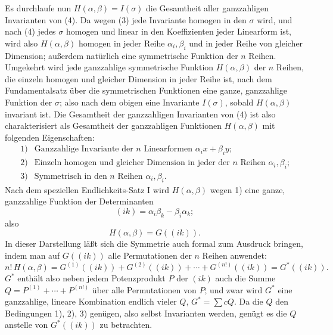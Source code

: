 \documentclass[11pt]{article}
\begin{document}
Es durchlaufe nun \(H(\alpha,\beta)=I(\sigma)\) die Gesamtheit aller ganzzahligen Invarianten von (4). Da wegen (3) jede Invariante homogen in den \(\sigma\) wird, und nach (4) jedes \(\sigma\) homogen und linear in den Koeffizienten jeder Linearform ist, wird also \(H(\alpha,\beta)\) homogen in jeder Reihe \(\alpha_i,\beta_i\) und in jeder Reihe von gleicher Dimension; außerdem natürlich eine symmetrische Funktion der \(n\) Reihen. Umgekehrt wird jede ganzzahlige symmetrische Funktion \(H(\alpha,\beta)\) der \(n\) Reihen, die einzeln homogen und gleicher Dimension in jeder Reihe ist, nach dem Fundamentalsatz über die symmetrischen Funktionen eine ganze, ganzzahlige Funktion der \(\sigma\); also nach dem obigen eine Invariante \(I(\sigma)\), sobald \(H(\alpha,\beta)\) invariant ist. Die Gesamtheit der ganzzahligen Invarianten von (4) ist also charakterisiert als Gesamtheit der ganzzahligen Funktionen \(H(\alpha,\beta)\) mit folgenden Eigenschaften:
\[
\begin{array}{ll}
1) & \text{Ganzzahlige Invariante der \(n\) Linearformen \(\alpha_i x+\beta_i y\);}\\
2) & \text{Einzeln homogen und gleicher Dimension in jeder der \(n\) Reihen \(\alpha_i,\beta_i\);}\\
3) & \text{Symmetrisch in den \(n\) Reihen \(\alpha_i,\beta_i\).}
\end{array}
\]
Nach dem speziellen Endlichkeits-Satz I wird \(H(\alpha,\beta)\) wegen 1) eine ganze, ganzzahlige Funktion der Determinanten
\[
        (ik)=\alpha_i\beta_k-\beta_i\alpha_k;
\]
also
\[
        H(\alpha,\beta)=G((ik)).
\]
In dieser Darstellung läßt sich die Symmetrie auch formal zum Ausdruck bringen, indem man auf \(G((ik))\) alle Permutationen der \(n\) Reihen anwendet:
\begin{equation}
        n!\,H(\alpha,\beta)
        =
        G^{(1)}((ik))+G^{(2)}((ik))+\cdots+G^{(n!)}((ik))
        =G^*((ik)).
\end{equation}
\(G^*\) enthält also neben jedem Potenzprodukt \(P\) der \((ik)\) auch die Summe \(Q=P^{(1)}+\cdots+P^{(n!)}\) über alle Permutationen von \(P\); und zwar wird \(G^*\) eine ganzzahlige, lineare Kombination endlich vieler \(Q\), \(G^*=\sum cQ\). Da die \(Q\) den Bedingungen 1), 2), 3) genügen, also selbst Invarianten werden, genügt es die \(Q\) anstelle von \(G^*((ik))\) zu betrachten.
\end{document}
